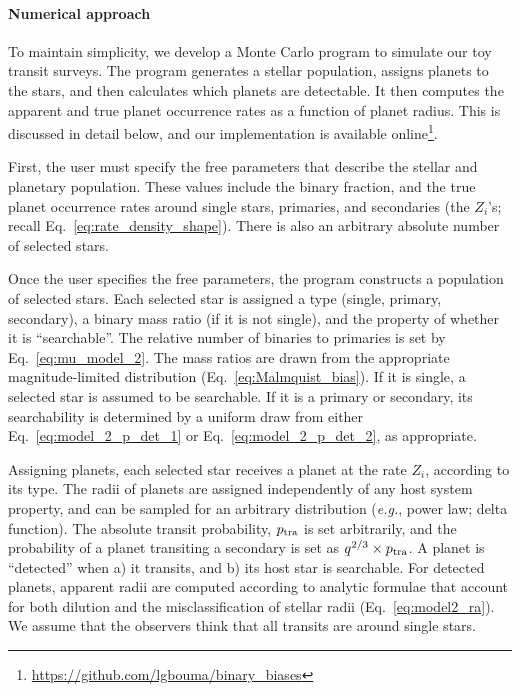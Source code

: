 \paragraph{Numerical approach}
To maintain simplicity, we develop a Monte Carlo program to simulate our 
toy transit surveys.
The program generates a stellar population, assigns planets to the stars, and 
then calculates which planets are detectable.
It then computes the apparent and true planet occurrence rates as a function 
of planet radius.
This is discussed in detail below, and our implementation is available 
online\footnote{\url{https://github.com/lgbouma/binary_biases}}.

First, the user must specify the free parameters that describe the 
stellar and planetary population. These values include the binary fraction, 
and the true planet occurrence rates around single stars, primaries, and 
secondaries (the $Z_i$'s; recall Eq.~\ref{eq:rate_density_shape}).
There is also an arbitrary absolute number of selected stars.

Once the user specifies the free parameters, the program constructs a 
population of selected stars.
Each selected star is assigned a type (single, primary, secondary), a 
binary mass ratio (if it is not single), and the property of whether it is 
``searchable''.
The relative number of binaries to primaries is set by 
Eq.~\ref{eq:mu_model_2}.
The mass ratios are drawn from the appropriate magnitude-limited distribution 
(Eq.~\ref{eq:Malmquist_bias}).
If it is single, a selected star is assumed to be searchable.
If it is a primary or secondary, its searchability is determined by a uniform 
draw from either Eq.~\ref{eq:model_2_p_det_1} or Eq.~\ref{eq:model_2_p_det_2}, 
as appropriate. 

Assigning planets, each selected star receives a planet at the rate $Z_i$, 
according to its type.
The radii of planets are assigned independently of any host system property, 
and can be sampled for an arbitrary distribution ({\it e.g.}, power law; delta 
function).
The absolute transit probability, $p_{\rm tra}$ is set arbitrarily, and the 
probability of a planet transiting a secondary is set as $q^{2/3}\times p_{\rm 
tra}$.
A planet is ``detected'' when a) it transits, and b) its host star is 
searchable.
For detected planets, apparent radii are computed according to analytic 
formulae that account for both dilution and the misclassification of stellar 
radii (Eq.~\ref{eq:model2_ra}).
We assume that the observers think that all transits are around single stars.

